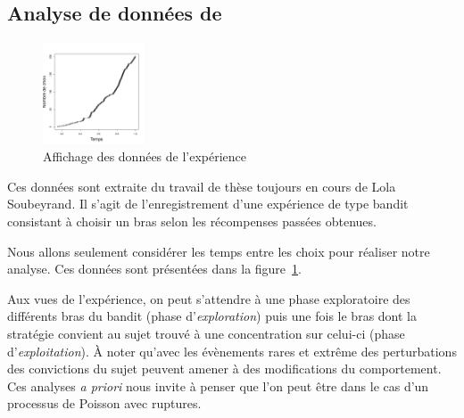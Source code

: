 \documentclass[a4paper,10pt]{article}\usepackage[]{graphicx}\usepackage[]{xcolor}
\newenvironment{knitrout}{}{} %
\begin{document}
\subsection*{Analyse de données de \cite{soubeyrandDonneesTheseExperience2024}}


\begin{figure}
    \centering
\begin{knitrout}
\color{fgcolor}
\includegraphics[width=0.27\textwidth,height=0.2\textheight]{figure/plot-soub-1} 
\end{knitrout}
    \vspace{-15pt}
    \caption{Affichage des données de l'expérience}
    \label{fig:donnees-soub}
\end{figure}

Ces données sont extraite du travail de thèse toujours en cours de Lola 
Soubeyrand. Il s'agit de l'enregistrement d'une expérience de type bandit 
consistant à choisir un bras selon les récompenses passées obtenues.

Nous allons seulement considérer les temps entre les choix pour réaliser notre 
analyse. Ces données sont présentées dans la figure~\ref{fig:donnees-soub}.

Aux vues de l'expérience, on peut s'attendre à une phase exploratoire des 
différents bras du bandit (phase d'\emph{exploration}) puis une fois le bras 
dont la stratégie convient au sujet trouvé à une concentration sur celui-ci 
(phase d'\emph{exploitation}). À noter qu'avec les évènements rares et extrême
des perturbations des convictions du sujet peuvent amener à des modifications du
comportement. Ces analyses \emph{a priori} nous invite à penser que l'on peut 
être dans le cas d'un processus de Poisson avec ruptures.
\end{document}
